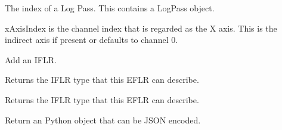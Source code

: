 \documentclass[letterpaper,10pt,english]{sphinxmanual}
\begin{document}
\begin{fulllineitems}
\label{\detokenize{ref/LIS/core/FileIndexer:TotalDepth.LIS.core.FileIndexer.IndexLogPass}}
The index of a Log Pass. This contains a LogPass object.

xAxisIndex is the channel index that is regarded as the X axis.
This is the indirect axis if present or defaults to channel 0.

\begin{fulllineitems}
\label{\detokenize{ref/LIS/core/FileIndexer:TotalDepth.LIS.core.FileIndexer.IndexLogPass.add}}
Add an IFLR.

\end{fulllineitems}


\begin{fulllineitems}
\label{\detokenize{ref/LIS/core/FileIndexer:TotalDepth.LIS.core.FileIndexer.IndexLogPass.canAdd}}
Returns the IFLR type that this EFLR can describe.

\end{fulllineitems}


\begin{fulllineitems}
\label{\detokenize{ref/LIS/core/FileIndexer:TotalDepth.LIS.core.FileIndexer.IndexLogPass.iflrType}}
Returns the IFLR type that this EFLR can describe.

\end{fulllineitems}


\begin{fulllineitems}
\label{\detokenize{ref/LIS/core/FileIndexer:TotalDepth.LIS.core.FileIndexer.IndexLogPass.jsonObject}}
Return an Python object that can be JSON encoded.


\end{fulllineitems}
\end{fulllineitems}
\end{document}
